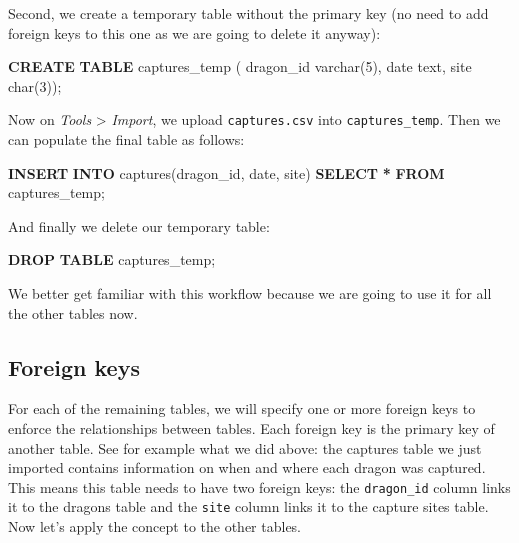 \documentclass[
]{book}
\newenvironment{Shaded}{\begin{snugshade}}{\end{snugshade}}
\newcommand{\DataTypeTok}[1]{\textcolor[rgb]{0.13,0.29,0.53}{#1}}
\newcommand{\DecValTok}[1]{\textcolor[rgb]{0.00,0.00,0.81}{#1}}
\newcommand{\KeywordTok}[1]{\textcolor[rgb]{0.13,0.29,0.53}{\textbf{#1}}}
\newcommand{\NormalTok}[1]{#1}
\newcommand{\OperatorTok}[1]{\textcolor[rgb]{0.81,0.36,0.00}{\textbf{#1}}}
\begin{document}
Second, we create a temporary table without the primary key (no need to add
foreign keys to this one as we are going to delete it anyway):

\begin{Shaded}
\begin{Highlighting}[]
\KeywordTok{CREATE} \KeywordTok{TABLE}\NormalTok{ captures\_temp (}
\NormalTok{dragon\_id }\DataTypeTok{varchar}\NormalTok{(}\DecValTok{5}\NormalTok{),}
\DataTypeTok{date}\NormalTok{ text,}
\NormalTok{site }\DataTypeTok{char}\NormalTok{(}\DecValTok{3}\NormalTok{));}
\end{Highlighting}
\end{Shaded}

Now on \emph{Tools} \textgreater{} \emph{Import}, we upload \texttt{captures.csv} into \texttt{captures\_temp}. Then
we can populate the final table as follows:

\begin{Shaded}
\begin{Highlighting}[]
\KeywordTok{INSERT} \KeywordTok{INTO}\NormalTok{ captures(dragon\_id, }\DataTypeTok{date}\NormalTok{, site) }\KeywordTok{SELECT} \OperatorTok{*} \KeywordTok{FROM}\NormalTok{ captures\_temp;}
\end{Highlighting}
\end{Shaded}

And finally we delete our temporary table:

\begin{Shaded}
\begin{Highlighting}[]
\KeywordTok{DROP} \KeywordTok{TABLE}\NormalTok{ captures\_temp;}
\end{Highlighting}
\end{Shaded}

We better get familiar with this workflow because we are going to use it for all
the other tables now.

\hypertarget{foreign-keys}{%
\subsection{Foreign keys}\label{foreign-keys}}

For each of the remaining tables, we will specify one or more foreign keys to
enforce the relationships between tables. Each foreign key is the primary key of
another table. See for example what we did above: the captures table we just
imported contains information on when and where each dragon was captured. This
means this table needs to have two foreign keys: the \texttt{dragon\_id} column links it
to the dragons table and the \texttt{site} column links it to the capture sites table.
Now let's apply the concept to the other tables.
\end{document}
